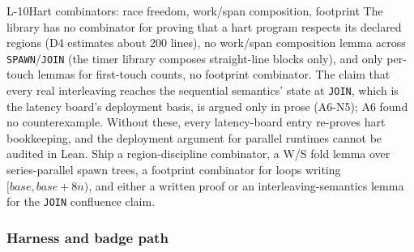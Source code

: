 \begin{issue}{L-10}{Hart combinators: race freedom, work/span composition, footprint}
\IRprob The library has no combinator for proving that a hart program respects its declared regions
(D4 estimates about 200 lines), no work/span composition lemma across \texttt{SPAWN}/\texttt{JOIN}
(the timer library composes straight-line blocks only), and only per-touch lemmas for first-touch
counts, no footprint combinator. The claim that every real interleaving reaches the sequential
semantics' state at \texttt{JOIN}, which is the latency board's deployment basis, is argued only in
prose (A6-N5); A6 found no counterexample.
\IRwhy Without these, every latency-board entry re-proves hart bookkeeping, and the deployment
argument for parallel runtimes cannot be audited in Lean.
\IRres Ship a region-discipline combinator, a W/S fold lemma over series-parallel spawn trees, a
footprint combinator for loops writing $[\mathit{base},\mathit{base}+8n)$, and either a written
proof or an interleaving-semantics lemma for the \texttt{JOIN} confluence claim.
\end{issue}

\subsubsection{Harness and badge path}

